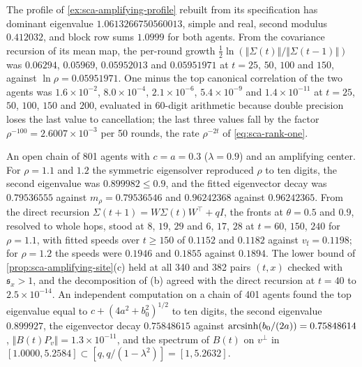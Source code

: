 \begin{numcheck}\label{chk:sca-rank-one}
The profile of \cref{ex:sca-amplifying-profile} rebuilt from its specification has dominant eigenvalue $1.0613266750560013$, simple and real, second modulus $0.412032$, and block row sums $1.0999$ for both agents. From the covariance recursion of its mean map, the per-round growth $\frac12\ln(\Vert\Sigma(t)\Vert/\Vert\Sigma(t-1)\Vert)$ was $0.06294$, $0.05969$, $0.05952013$ and $0.05951971$ at $t=25$, $50$, $100$ and $150$, against $\ln\rho=0.05951971$. One minus the top canonical correlation of the two agents was $1.6\times10^{-2}$, $8.0\times10^{-4}$, $2.1\times10^{-6}$, $5.4\times10^{-9}$ and $1.4\times10^{-11}$ at $t=25$, $50$, $100$, $150$ and $200$, evaluated in 60-digit arithmetic because double precision loses the last value to cancellation; the last three values fall by the factor $\rho^{-100}=2.6007\times10^{-3}$ per 50 rounds, the rate $\rho^{-2t}$ of \eqref{eq:sca-rank-one}.
\end{numcheck}

\begin{numcheck}\label{chk:sca-amplifying-site}
An open chain of 801 agents with $c=a=0.3$ ($\lambda=0.9$) and an amplifying center. For $\rho=1.1$ and $1.2$ the symmetric eigensolver reproduced $\rho$ to ten digits, the second eigenvalue was $0.899982\le0.9$, and the fitted eigenvector decay was $0.79536555$ against $m_\rho=0.79536546$ and $0.96242368$ against $0.96242365$. From the direct recursion $\Sigma(t+1)=W\Sigma(t)W^\top+qI$, the fronts at $\theta=0.5$ and $0.9$, resolved to whole hops, stood at $8$, $19$, $29$ and $6$, $17$, $28$ at $t=60$, $150$, $240$ for $\rho=1.1$, with fitted speeds over $t\ge150$ of $0.1152$ and $0.1182$ against $v_{\mathrm f}=0.1198$; for $\rho=1.2$ the speeds were $0.1946$ and $0.1855$ against $0.1894$. The lower bound of \cref{prop:sca-amplifying-site}(c) held at all 340 and 382 pairs $(t,x)$ checked with $\mathfrak s_x>1$, and the decomposition of (b) agreed with the direct recursion at $t=40$ to $2.5\times10^{-14}$. An independent computation on a chain of 401 agents found the top eigenvalue equal to $c+(4a^2+b_0^2)^{1/2}$ to ten digits, the second eigenvalue $0.899927$, the eigenvector decay $0.75848615$ against $\operatorname{arcsinh}(b_0/(2a))=0.75848614$, $\Vert B(t)P_v\Vert=1.3\times10^{-11}$, and the spectrum of $B(t)$ on $v^\perp$ in $[1.0000,5.2584]\subset[q,q/(1-\lambda^2)]=[1,5.2632]$.
\end{numcheck}

